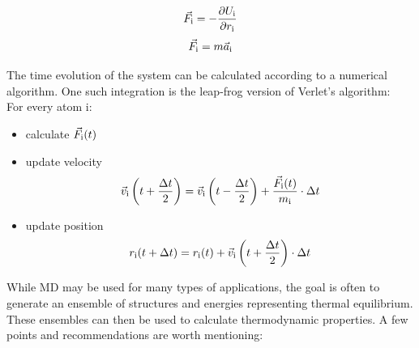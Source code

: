 \documentclass[a4paper,12pt]{article}
\begin{document}
\def\eqnw{\vec F_{\rm i} = -{\partial U_{\rm i} \over \partial r_{\rm i}}
\label {eqnw}}
\begin{equation}
\eqnw{}
\end{equation}
\def\eqnww{\vec F_{\rm i} = {m \vec a_{\rm i}}
\label {eqnww}}
\begin{equation}
\eqnww{}
\end{equation}

The time evolution of the system can be calculated according to a numerical algorithm. One such integration is the  leap-frog version of Verlet's algorithm:\\
For every atom i:
\begin{itemize}
\item   calculate $ \vec F_{\rm i}(t)$
\item   update velocity $$\vec v_{\rm i}\left(t + {\Delta t \over 2}\right) = \vec v_{\rm i} \left(t - {\Delta t \over 2}\right) + {\vec F_{\rm i}(t) \over m_{\rm i}} \cdot \Delta t$$
\item   update position $$r_{\rm i}(t+\Delta t) = r_{\rm i}(t) + \vec v_{\rm i}\left(t+{\Delta t \over 2}\right)\cdot \Delta t$$
\end {itemize}
While MD may be used for many types of applications, the goal is often to generate an ensemble of structures and energies representing thermal equilibrium. These ensembles can then be used to calculate thermodynamic properties. A few points and recommendations are worth mentioning:
\end{document}
